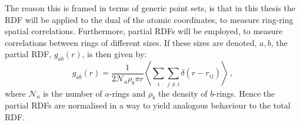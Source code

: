 The reason this is framed in terms of generic point sets, is that in this thesis the RDF will be applied to the dual of the atomic coordinates, to measure ring\--ring spatial correlations.
Furthermore, partial RDFs will be employed, to measure correlations between rings of different sizes.
If these sizes are denoted, $a,b$, the partial RDF, $g_{ab}\left(r\right)$, is then given by:
\begin{equation}
	g_{ab}\left(r\right)=\frac{1}{2 \mathcal{N}_a \rho_b \pi r}\left\langle \sum_i \sum_{j\neq i} \delta\left(r-r_{ij}\right)\right\rangle\,, 
\end{equation} 
where $\mathcal{N}_a$ is the number of $a$\--rings and $\rho_b$ the density of $b$\--rings.
Hence the partial RDFs are normalised in a way to yield analogous behaviour to the total RDF.



